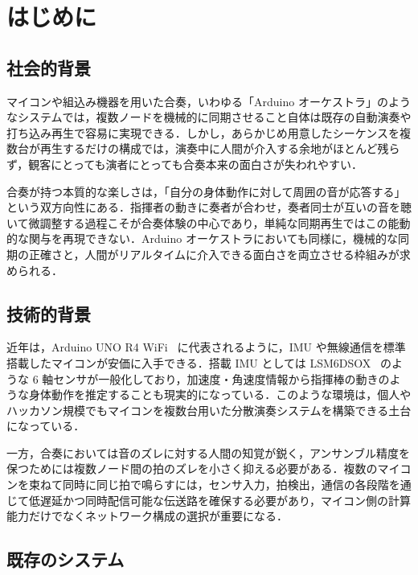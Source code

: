 \section{はじめに}
\label{sec:introduction}


\subsection{社会的背景}
\label{subsec:social_background}

マイコンや組込み機器を用いた合奏，いわゆる「Arduino オーケストラ」のようなシステムでは，複数ノードを機械的に同期させること自体は既存の自動演奏や打ち込み再生で容易に実現できる．しかし，あらかじめ用意したシーケンスを複数台が再生するだけの構成では，演奏中に人間が介入する余地がほとんど残らず，観客にとっても演者にとっても合奏本来の面白さが失われやすい．

合奏が持つ本質的な楽しさは，「自分の身体動作に対して周囲の音が応答する」という双方向性にある．指揮者の動きに奏者が合わせ，奏者同士が互いの音を聴いて微調整する過程こそが合奏体験の中心であり，単純な同期再生ではこの能動的な関与を再現できない．Arduino オーケストラにおいても同様に，機械的な同期の正確さと，人間がリアルタイムに介入できる面白さを両立させる枠組みが求められる．

\subsection{技術的背景}
\label{subsec:technical_background}

近年は，Arduino UNO R4 WiFi~\cite{arduino_uno_r4} に代表されるように，IMU や無線通信を標準搭載したマイコンが安価に入手できる．搭載 IMU としては LSM6DSOX~\cite{lsm6dsox} のような 6 軸センサが一般化しており，加速度・角速度情報から指揮棒の動きのような身体動作を推定することも現実的になっている．このような環境は，個人やハッカソン規模でもマイコンを複数台用いた分散演奏システムを構築できる土台になっている．

一方，合奏においては音のズレに対する人間の知覚が鋭く，アンサンブル精度を保つためには複数ノード間の拍のズレを小さく抑える必要がある．複数のマイコンを束ねて同時に同じ拍で鳴らすには，センサ入力，拍検出，通信の各段階を通じて低遅延かつ同時配信可能な伝送路を確保する必要があり，マイコン側の計算能力だけでなくネットワーク構成の選択が重要になる．

\subsection{既存のシステム}
\label{subsec:existing_systems}

